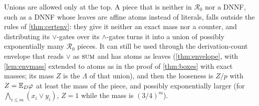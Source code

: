 Unions are allowed only at the top. A piece that is neither in $\mathcal R_0$ nor
a DNNF, such as a DNNF whose leaves are affine atoms instead of literals, falls
outside the rules of \cref{thm:certenv}: they give it neither an exact mass nor a
counter, and distributing its $\vee$-gates over its $\wedge$-gates turns it into a union
of possibly exponentially many $\mathcal R_0$ pieces. It can still be used through the
derivation-count envelope that reads $\vee$ as $\textsc{sum}$ and has atoms as leaves
(\cref{thm:envelope}, with \cref{lem:envmass} extended to atoms as in the proof of
\cref{thm:boxes} with exact masses; its mass $Z$ is the $\Lambda$ of that union), and
then the looseness is $Z/p$ with $Z=\mathbb{E}_D\varphi$ at least the mass of the piece, and
possibly exponentially larger (for $\bigwedge_{i\le m}(x_i\vee y_i)$, $Z=1$ while the
mass is $(3/4)^m$).

